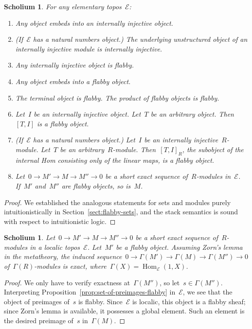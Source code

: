 \documentclass[oneside]{amsart}
\theoremstyle{definition}
\theoremstyle{plain}
\newtheorem{scholium}[defn]{Scholium}
\theoremstyle{remark}
\newcommand{\E}{\mathcal{E}}
\DeclareMathOperator{\Hom}{Hom}
\renewcommand{\_}{\mathpunct{.}\,}
\begin{document}
\begin{scholium}\label{scholium:properties-of-flabby-objects}
For any elementary topos~$\E$:
\begin{enumerate}
\item Any object embeds into an internally injective object.
\item (If~$\E$ has a natural numbers object.) The underlying unstructured
object of an internally injective module is internally injective.
\item Any internally injective object is flabby.
\item Any object embeds into a flabby object.
\item The terminal object is flabby. The product of flabby objects is flabby.
\item Let~$I$ be an internally injective object. Let~$T$ be an arbitrary
object. Then~$[T,I]$ is a flabby object.
\item (If~$\E$ has a natural numbers object.) Let~$I$ be an internally
injective~$R$-module. Let~$T$ be an arbitrary~$R$-module. Then~$[T,I]_R$, the
subobject of the internal Hom consisting only of the linear maps, is a flabby
object.
\item Let~$0 \to M' \to M \to M'' \to 0$ be a short exact sequence
of~$R$-modules in~$\E$. If~$M'$ and~$M''$ are flabby objects, so is~$M$.
\end{enumerate}
\end{scholium}

\begin{proof}We established the analogous statements for sets and modules purely
intuitionistically in Section~\ref{sect:flabby-sets}, and the stack semantics
is sound with respect to intuitionistic logic.
\end{proof}

\begin{scholium}\label{scholium:exact-as-presheaves}
Let~$0 \to M' \to M \to M'' \to 0$ be a short exact sequence
of~$R$-modules in a localic topos~$\E$. Let~$M'$ be a flabby object.
Assuming Zorn's lemma in the metatheory, the induced sequence~$0 \to
\Gamma(M') \to \Gamma(M) \to \Gamma(M'') \to 0$ of~$\Gamma(R)$-modules is exact,
where~$\Gamma(X) = \Hom_\E(1,X)$.\end{scholium}

\begin{proof}We only have to verify exactness at~$\Gamma(M'')$, so let~$s \in
\Gamma(M'')$. Interpreting Proposition~\ref{prop:set-of-preimages-flabby}
in~$\E$, we see that the object of preimages of~$s$ is flabby. Since~$\E$ is
localic, this object is a flabby sheaf; since Zorn's lemma is available, it
possesses a global element. Such an element is the desired preimage of~$s$
in~$\Gamma(M)$.\end{proof}
\end{document}
